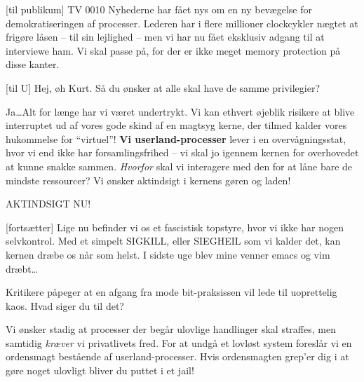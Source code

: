 \documentclass[a4paper,11pt]{article}
\begin{document}
\begin{sketch}


[til publikum] TV 0010 Nyhederne har fået nys om en ny bevægelse for
demokratiseringen af processer. Lederen har i flere millioner clockcykler nægtet
at frigøre låsen -- til sin lejlighed -- men vi har nu fået eksklusiv adgang til
at interviewe ham. Vi skal passe på, for der er ikke meget memory protection på
disse kanter.


[til U] Hej, øh  Kurt. Så du ønsker
at alle skal have de samme privilegier?


 Ja\ldots Alt for længe har vi været undertrykt. Vi kan
ethvert øjeblik risikere at blive interruptet ud af vores gode skind
af en magtsyg kerne, der tilmed kalder vores hukommelse for
``virtuel''! \textbf{Vi userland-processer} lever i en
overvågningsstat, hvor vi end ikke har forsamlingsfrihed -- vi skal jo
igennem kernen for overhovedet at kunne snakke sammen. \emph{Hvorfor}
skal vi interagere med den for at låne bare de mindste ressourcer?
Vi ønsker aktindsigt i kernens gøren og laden!

 AKTINDSIGT NU!

[fortsætter] Lige nu befinder vi os et fascistisk topstyre, hvor vi ikke
har nogen selvkontrol. Med et simpelt SIGKILL, eller SIEGHEIL som vi kalder
det, kan kernen dræbe os når som helst. I sidste uge blev mine venner emacs og
vim dræbt\ldots {}

 Kritikere påpeger at en afgang fra mode bit-praksissen vil lede til
uoprettelig kaos. Hvad siger du til det?

 Vi ønsker stadig at processer der begår ulovlige handlinger skal
straffes, men samtidig \emph{kræver} vi privatlivets fred. For at undgå et
lovløst system foreslår vi en ordensmagt bestående af userland-processer. Hvis
ordensmagten grep'er dig i at gøre noget ulovligt bliver du puttet i et jail!


\end{sketch}
\end{document}
